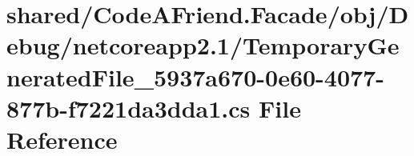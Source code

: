 \hypertarget{shared_2_code_a_friend_8_facade_2obj_2_debug_2netcoreapp2_81_2_temporary_generated_file__5937a679f0926c5d8a842b3bba276d28195a03e}{}\section{shared/\+Code\+A\+Friend.Facade/obj/\+Debug/netcoreapp2.1/\+Temporary\+Generated\+File\+\_\+5937a670-\/0e60-\/4077-\/877b-\/f7221da3dda1.cs File Reference}
\label{shared_2_code_a_friend_8_facade_2obj_2_debug_2netcoreapp2_81_2_temporary_generated_file__5937a679f0926c5d8a842b3bba276d28195a03e}
